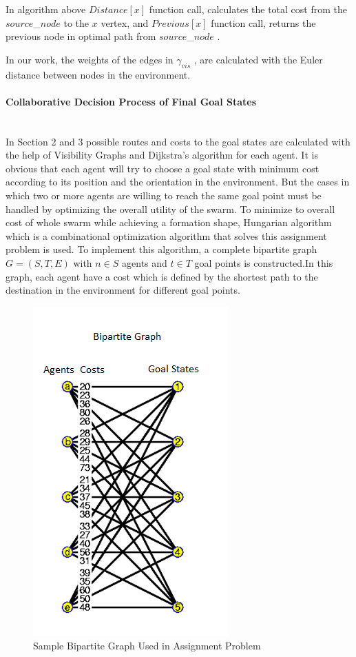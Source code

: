 In algorithm above $Distance[x]$ function call, calculates the total cost from the $source$\_$ node$ to the $x$ vertex, and $Previous[x]$ function call, returns the previous node in optimal path from $source$\_$ node$ .

In our work, the weights of the edges in $\gamma_{vis}$ , are calculated with the Euler distance between nodes in the environment.  

\paragraph{Collaborative Decision Process of Final Goal States}\hspace{0pt} \\
In Section 2 and 3 possible routes and costs to the goal states are calculated with the help of Visibility Graphs and Dijkstra's algorithm  for each agent. It is obvious that each agent will try to choose a goal state with minimum cost according to its position and the orientation in the environment. But the cases in which two or more agents are willing to reach the same goal point must be handled by optimizing the overall utility of the swarm. To minimize to overall cost of whole swarm while achieving a formation shape, Hungarian algorithm which is a combinational optimization algorithm that solves this assignment problem is used. To implement this algorithm, a complete bipartite graph $G=(S,T,E)$ with $n \in S$ agents and $t \in T$ goal points is constructed.In this graph, each agent have a cost which is defined by the shortest path to the destination in the environment for different goal points. 

\begin{figure}[H]
\centering
\includegraphics[width=.4\textwidth]{bipartite}
\caption{Sample Bipartite Graph Used in Assignment Problem}
\end{figure}


